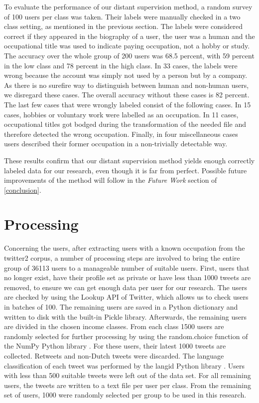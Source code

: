 \documentclass[
10pt, %
a4paper, %
oneside, %
headinclude,footinclude, %
] {book}%
\begin{document}
To evaluate the performance of our distant supervision method, a random survey of 100 users per class was taken. Their labels were manually checked in a two class setting, as mentioned in the previous section. The labels were considered correct if they appeared in the biography of a user, the user was a human and the occupational title was used to indicate paying occupation, not a hobby or study. The accuracy over the whole group of 200 users was 68.5 percent, with 59 percent in the low class and 78 percent in the high class. In 33 cases, the labels were wrong because the account was simply not used by a person but by a company. As there is no surefire way to distinguish between human and non-human users, we disregard these cases. The overall accuracy without these cases is 82 percent. The last few cases that were wrongly labeled consist of the following cases. In 15 cases, hobbies or voluntary work were labelled as an occupation. In 11 cases, occupational titles got bodged during the transformation of the needed file and therefore detected the wrong occupation. Finally, in four miscellaneous cases users described their former occupation in a non-trivially detectable way.

These results confirm that our distant supervision method yields enough correctly labeled data for our research, even though it is far from perfect. Possible future improvements of the method will follow in the \textit{Future Work} section of \autoref{conclusion}.


\section{Processing}
\label{sec:processing}
Concerning the users, after extracting users with a known occupation from the twitter2 corpus, a number of processing steps are involved to bring the entire group of 36113 users to a manageable number of suitable users. First, users that no longer exist, have their profile set as private or have less than 1000 tweets are removed, to ensure we can get enough data per user for our research. The users are checked by using the Lookup API of Twitter, which allows us to check users in batches of 100. The remaining users are saved in a Python dictionary and written to disk with the built-in Pickle library. Afterwards, the remaining users are divided in the chosen income classes. From each class 1500 users are randomly selected for further processing by using the random.choice function of the NumPy Python library \citep{numpy}. For these users, their latest 1000 tweets are collected. Retweets and non-Dutch tweets were discarded. The language classification of each tweet was performed by the langid Python library \citep{langid}. Users with less than 500 suitable tweets were left out of the data set. For all remaining users, the tweets are written to a text file per user per class. From the remaining set of users, 1000 were randomly selected per group to be used in this research.
\end{document}
